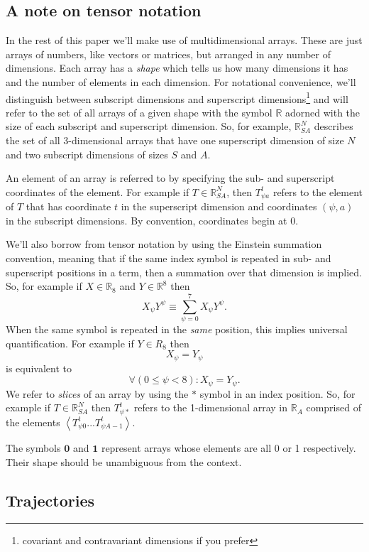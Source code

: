 \documentclass{article}
\begin{document}
\subsection{A note on tensor notation}

In the rest of this paper we'll make use of multidimensional arrays. These are just arrays of numbers, like vectors or matrices, but arranged in any number of dimensions. Each array has a \textit{shape} which tells us how many dimensions it has and the number of elements in each dimension. For notational convenience, we'll distinguish between subscript dimensions and superscript dimensions\footnote{covariant and contravariant dimensions if you prefer} and will refer to the set of all arrays of a given shape with the symbol $\mathbb{R}$ adorned with the size of each subscript and superscript dimension.  So, for example, $\mathbb{R}^N_{SA}$ describes the set of all 3-dimensional arrays that have one superscript dimension of size $N$ and two subscript dimensions of sizes $S$ and $A$.

An element of an array is referred to by specifying the sub- and superscript coordinates of the element. For example if $T \in \mathbb{R}^N_{SA}$, then $T^t_{\psi a}$ refers to the element of $T$ that has coordinate $t$ in the superscript dimension and coordinates $(\psi,a)$ in the subscript dimensions. By convention, coordinates begin at 0.

We'll also borrow from tensor notation by using the Einstein summation convention, meaning that if the same index symbol is repeated in sub- and superscript positions in a term, then a summation over that dimension is implied. So, for example if $X \in \mathbb{R}_8$ and $Y \in \mathbb{R}^8$ then
\[
X_\psi Y^\psi \equiv \sum_{\psi=0}^7 X_\psi  Y^\psi.
\]
When the same symbol is repeated in the \textit{same} position, this implies universal quantification. For example if $Y\in R_8$ then
\[
X_\psi = Y_\psi 
\]
is equivalent to
\[
\forall (0 \le \psi < 8) : X_\psi = Y_\psi.
\]
We refer to \textit{slices} of an array by using the $*$ symbol in an index position. So, for example if $T \in \mathbb{R}^N_{SA}$ then $T^t_{\psi *}$ refers to the 1-dimensional array in $\mathbb{R}_A$ comprised of the elements $\left<T^t_{\psi 0}...T^t_{\psi A-1}\right>$.

The symbols $\mathbf{0}$ and $\mathbf{1}$ represent arrays whose elements are all 0 or 1 respectively. Their shape should be unambiguous from the context.

\subsection{Trajectories}
\end{document}

